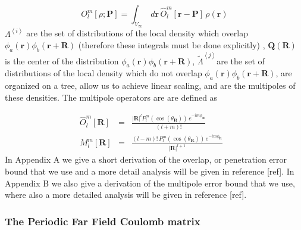 \commentoutA{\documentclass[prb,aps,twocolumn,showpacs,twocolumngrid,superbib]{revtex4}}
\begin{document}
\begin{equation}
\label{sp_rho_loc}
O_{l}^{m}\left[ \rho ;\mathbf{P}\right] =\int _{V_{\infty }}\, d\mathbf{r}\, \widehat{O}_{l}^{m}\left[ \mathbf{r}-\mathbf{P}\right] \, \rho \left( \mathbf{r}\right) 
\end{equation}
\( \Lambda ^{\left\langle i\right\rangle } \) are the set of distributions
of the local density which overlap \( \phi _{a}({\mathbf{r}})\phi _{b}({\mathbf{r}+\mathbf{R}}) \)
(therefore these integrals must be done explicitly) , \( \mathbf{Q}(\mathbf{R}) \)
is the center of the distribution \( \phi _{a}({\mathbf{r}})\phi _{b}({\mathbf{r}+\mathbf{R}}) \),
\( \widetilde{\Lambda }^{\left\langle j\right\rangle } \)are the
set of distributions of the local density which do not overlap \( \phi _{a}({\mathbf{r}})\phi _{b}({\mathbf{r}+\mathbf{R}}) \),
are organized on a tree, allow us to achieve linear scaling, and are
the multipoles of these densities. The multipole operators are are
defined as

\begin{eqnarray}
\widehat{O}_{l}^{m}\left[ {\mathbf{R}}\right]  & = & \frac{\left| {\mathbf{R}}\right| ^{l}P_{l}^{m}\left( \cos \left( \theta _{\mathbf{R}}\right) \right) \, e^{-im\phi _{\mathbf{R}}}}{\left( l+m\right) !}\begin{array}{c}
\\

\end{array}\label{sp_mult_O} \\
M_{l}^{m}\left[ {\mathbf{R}}\right]  & = & \frac{\left( l-m\right) !\, P_{l}^{m}\left( \cos \left( \theta _{\mathbf{R}}\right) \right) \, e^{-im\phi _{\mathbf{R}}}}{\left| {\mathbf{R}}\right| ^{l+1}}\begin{array}{c}
\\

\end{array}\label{sp_mult_M} 
\end{eqnarray}
 In Appendix A we give a short derivation of the overlap, or penetration
error bound that we use and a more detail analysis will be given in
reference {[}ref{]}. In Appendix B we also give a derivation of the
multipole error bound that we use, where also a more detailed analysis
will be given in reference {[}ref{]}. 


\subsubsection{The Periodic Far Field Coulomb matrix}
\end{document}
